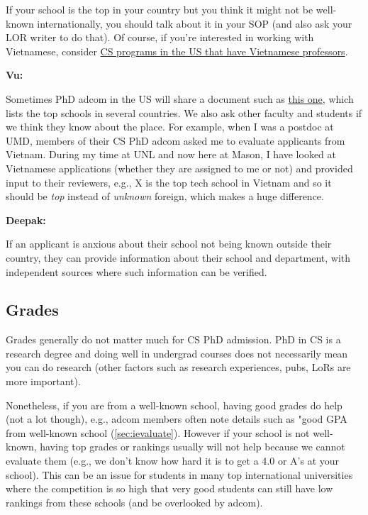 \documentclass[oneside,11pt,dvipsnames]{book}
\newenvironment{commentbox}[1][]{
  \small
  \begin{mybox}
    {\small \textbf{#1}}
  }{
  \end{mybox}
}
\begin{document}
If your school is the top in your country but you think it might not be well-known internationally, you should talk about it in your SOP (and also ask your LOR writer to do that). Of course, if you're interested in working with Vietnamese, consider  \href{https://github.com/dynaroars/dynaroars.github.io/wiki/Viet-CS-Profs-US}{CS programs in the US that have Vietnamese professors}. %

\begin{commentbox}[Vu:]
  Sometimes PhD adcom in the US will share a document such as \href{https://github.com/dynaroars/dynaroars.github.io/wiki/Foreign-Top-Schools}{this one}, which lists the top schools in several countries. We also ask other faculty and students if we think they know about the place.  For example, when I was a postdoc at UMD, members of their CS PhD adcom asked me to evaluate applicants from Vietnam.  During my time at UNL and now here at Mason, I have looked at Vietnamese applications (whether they are assigned to me or not) and provided input to their reviewers, e.g., X is the top tech school in Vietnam and so it should be \emph{top} instead of \emph{unknown} foreign, which makes a huge difference.
\end{commentbox}
\begin{commentbox}[Deepak:]
  If an applicant is anxious about their school not being known outside their country, they can provide information about their school and department, with independent sources where such information can be verified.
\end{commentbox}

\subsection{Grades} Grades generally do not matter much for CS PhD admission. PhD in CS is a research degree and doing well in undergrad courses does not necessarily mean you can do research (other factors such as research experiences, pubs, LoRs are more important).

Nonetheless, if you are from a well-known school, having good grades do help (not a lot though), e.g., adcom members often note details such as "good GPA from well-known school (\autoref{sec:ievaluate}). However if your school is not well-known, having top grades or rankings usually will not help because we cannot evaluate them (e.g., we don't know how hard it is to get a 4.0 or A's at your school). This can be an issue for students in many top international universities where the competition is so high that very good students can still have low rankings from these schools (and be overlooked by adcom).
\end{document}
